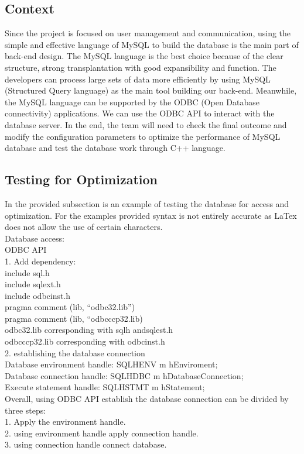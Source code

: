 \documentclass[onecolumn, draftclsnofoot,10pt, compsoc]{IEEEtran}
\begin{document}
\subsection{Context}
Since the project is focused on user management and communication, using the simple and effective language of MySQL to build the database is the main part of back-end design. The MySQL language is the best choice because of the clear structure, strong transplantation with good expansibility and function. The developers can process large sets of data more efficiently by using MySQL (Structured Query language) as the main tool building our back-end. 
Meanwhile, the MySQL language can be supported by the ODBC (Open Database connectivity) applications. We can use the ODBC API to interact with the database server. In the end, the team will need to check the final outcome and modify the configuration parameters to optimize the performance of MySQL database and test the database work through C++ language.

\subsection{Testing for Optimization}
In the provided subsection is an example of testing the database for access and optimization. For the examples provided syntax is not entirely accurate as LaTex does not allow the use of certain characters. \\

Database access:\\  
ODBC API\\
1. Add dependency:\\ 
include \big\langle sql.h\big\rangle\\
include \big\langle sqlext.h\big\rangle\\
include \big\langle odbcinst.h\big\rangle\\

pragma comment (lib, “odbc32.lib”)\\
pragma comment (lib, “odbcccp32.lib)\\

odbc32.lib corresponding with sqlh andsqlest.h\\
odbcccp32.lib corresponding with odbcinst.h\\
2. establishing the database connection \\
Database environment handle: SQLHENV m hEnviroment;\\
Database connection handle: SQLHDBC m hDatabaseConnection;\\ 
Execute statement handle: SQLHSTMT m hStatement; \\
Overall, using ODBC API establish the database connection can be divided by three steps:\\
1. Apply the environment handle.\\
2. using environment handle apply connection handle.\\ 
3. using connection handle connect database. \\
\end{document}

